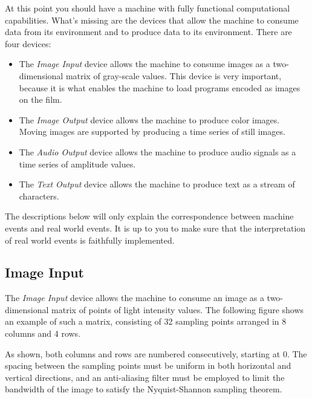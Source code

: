 \documentclass[a4paper,12pt]{article}
\begin{document}
At this point you should have a machine with fully functional computational capabilities.
What's missing are the devices that allow the machine to consume data from its environment and to produce data to its environment.
There are four devices:
\begin{itemize}
\item The \emph{Image Input} device allows the machine to consume images as a two-dimensional matrix of gray-scale values.
  This device is very important, because it is what enables the machine to load programs encoded as images on the film.
\item The \emph{Image Output} device allows the machine to produce color images.
  Moving images are supported by producing a time series of still images.
\item The \emph{Audio Output} device allows the machine to produce audio signals as a time series of amplitude values.
\item The \emph{Text Output} device allows the machine to produce text as a stream of characters.
\end{itemize}
The descriptions below will only explain the correspondence between machine events and real world events.
It is up to you to make sure that the interpretation of real world events is faithfully implemented.

\subsection{Image Input}

The \emph{Image Input} device allows the machine to consume an image as a two-dimensional matrix of points of light intensity values.
The following figure shows an example of such a matrix, consisting of 32 sampling points arranged in 8 columns and 4 rows.
\begin{center}
\end{center}
As shown, both columns and rows are numbered consecutively, starting at 0.
The spacing between the sampling points must be uniform in both horizontal and vertical directions, and an anti-aliasing filter must be employed to limit the bandwidth of the image to satisfy the Nyquist-Shannon sampling theorem.
\end{document}
